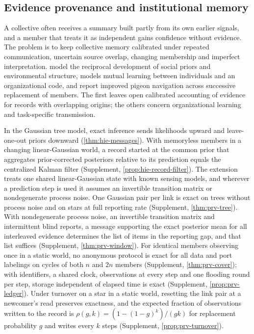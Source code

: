 \subsection{Evidence provenance and institutional memory}\label{sec:opn-5}

A collective often receives a summary built partly from its own earlier signals, and a member that treats it as independent gains confidence without evidence. The problem is to keep collective memory calibrated under repeated communication, uncertain source overlap, changing membership and imperfect interpretation. \citet{nomura2026social} model the reciprocal development of social priors and environmental structure, \citet{march1991exploration} models mutual learning between individuals and an organizational code, and \citet{sasaki2017cumulative} report improved pigeon navigation across successive replacement of members. The first leaves open calibrated accounting of evidence for records with overlapping origins; the others concern organizational learning and task-specific transmission.

In the Gaussian tree model, exact inference sends likelihoods upward and leave-one-out priors downward (\cref{thm:hie-messages}). With memoryless members in a changing linear-Gaussian world, a record started at the common prior that aggregates prior-corrected posteriors relative to its prediction equals the centralized Kalman filter (Supplement, \cref{prop:hie-record-filter}). The extension treats one shared linear-Gaussian state with known sensing models, and wherever a prediction step is used it assumes an invertible transition matrix or nondegenerate process noise. One Gaussian pair per link is exact on trees without process noise and on stars at full reporting rate (Supplement, \cref{thm:prv-tree}). With nondegenerate process noise, an invertible transition matrix and intermittent blind reports, a message supporting the exact posterior mean for all interleaved evidence determines the list of items in the reporting gap, and that list suffices (Supplement, \cref{thm:prv-window}). For identical members observing once in a static world, no anonymous protocol is exact for all data and port labelings on cycles of both $n$ and $2n$ members (Supplement, \cref{thm:prv-cover}); with identifiers, a shared clock, observations at every step and one flooding round per step, storage independent of elapsed time is exact (Supplement, \cref{prop:prv-ledger}). Under turnover on a star in a static world, resetting the link pair at a newcomer's read preserves exactness, and the expected fraction of observations written to the record is $\rho(g,k)=(1-(1-g)^k)/(gk)$ for replacement probability $g$ and writes every $k$ steps (Supplement, \cref{prop:prv-turnover}).

